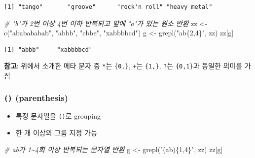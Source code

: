 \documentclass[
  11pt,
]{krantz}
\makeatletter
\newenvironment{Shaded}{\begin{snugshade}}{\end{snugshade}}
\newcommand{\CommentTok}[1]{\textcolor[rgb]{0.37,0.37,0.37}{\textit{#1}}}
\newcommand{\FunctionTok}[1]{\textcolor[rgb]{0,0,0}{#1}}
\newcommand{\NormalTok}[1]{#1}
\newcommand{\OtherTok}[1]{\textcolor[rgb]{0.37,0.37,0.37}{#1}}
\newcommand{\StringTok}[1]{\textcolor[rgb]{0.5,0.5,0.5}{#1}}
\providecommand{\tightlist}{%
  \setlength{\itemsep}{0pt}\setlength{\parskip}{0pt}}
\newenvironment{kframe}{%
\medskip{}
\setlength{\fboxsep}{.8em}
 \def\at@end@of@kframe{}%
 \ifinner\ifhmode%
  \def\at@end@of@kframe{\end{minipage}}%
  \begin{minipage}{\columnwidth}%
 \fi\fi%
 \def\FrameCommand##1{\hskip\@totalleftmargin \hskip-\fboxsep
 \colorbox{shadecolor}{##1}\hskip-\fboxsep
     \hskip-\linewidth \hskip-\@totalleftmargin \hskip\columnwidth}%
 \MakeFramed {\advance\hsize-\width
   \@totalleftmargin\z@ \linewidth\hsize
   \@setminipage}}%
 {\par\unskip\endMakeFramed%
 \at@end@of@kframe}
\newenvironment{rmdblock}[1]
  {
  \begin{itemize}
  \renewcommand{\labelitemi}{
    \raisebox{-.7\height}[0pt][0pt]{
      {\setkeys{Gin}{width=3em,keepaspectratio}\texttt{[image: images/\#1]}}
    }
  }
  \setlength{\fboxsep}{1em}
  \begin{kframe}
  \item
  }
  {
  \end{kframe}
  \end{itemize}
  }
\newenvironment{rmdnote}
  {\begin{rmdblock}{note}}
  {\end{rmdblock}}
\makeatother
\begin{document}
\begin{verbatim}
[1] "tango"       "groove"      "rock'n roll" "heavy metal"
\end{verbatim}

\begin{Shaded}
\begin{Highlighting}[]
\CommentTok{\# "b"가 2번 이상 4번 이하 반복되고 앞에 "a"가 있는 원소 반환}
\NormalTok{zz }\OtherTok{\textless{}{-}} \FunctionTok{c}\NormalTok{(}\StringTok{"ababababab"}\NormalTok{, }\StringTok{"abbb"}\NormalTok{, }\StringTok{"cbbe"}\NormalTok{, }\StringTok{"xabbbbcd"}\NormalTok{)}
\NormalTok{g }\OtherTok{\textless{}{-}} \FunctionTok{grepl}\NormalTok{(}\StringTok{"ab\{2,4\}"}\NormalTok{, zz)}
\NormalTok{zz[g]}
\end{Highlighting}
\end{Shaded}

\begin{verbatim}
[1] "abbb"     "xabbbbcd"
\end{verbatim}

\normalsize

\footnotesize

\begin{rmdnote}
\textbf{참고}: 위에서 소개한 메타 문자 중 \texttt{*}는 \texttt{\{0,\}}, \texttt{+}는 \texttt{\{1,\}}, \texttt{?}는 \texttt{\{0,1\}}과 동일한 의미를 가짐
\end{rmdnote}

\normalsize

\hypertarget{parenthesis}{%
\subsubsection*{\texorpdfstring{\textbf{\texttt{()} (parenthesis)}}{() (parenthesis)}}\label{parenthesis}}


\begin{itemize}
\tightlist
\item
  특정 문자열을 \texttt{()}로 grouping
\item
  한 개 이상의 그룹 지정 가능
\end{itemize}

\footnotesize

\begin{Shaded}
\begin{Highlighting}[]
\CommentTok{\# ab가 1\textasciitilde{}4회 이상 반복되는 문자열 반환}
\NormalTok{g }\OtherTok{\textless{}{-}} \FunctionTok{grepl}\NormalTok{(}\StringTok{"(ab)\{1,4\}"}\NormalTok{, zz)}
\NormalTok{zz[g]}
\end{Highlighting}
\end{Shaded}
\end{document}
